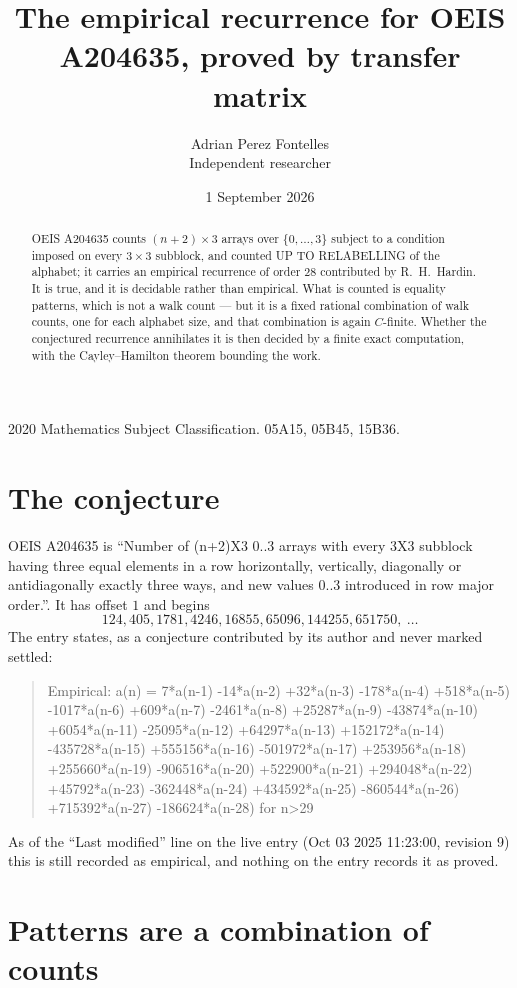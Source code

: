 \documentclass[11pt,a4paper]{article}
\title{The empirical recurrence for OEIS A204635, proved by transfer matrix}
\author{Adrian Perez Fontelles\\ \small Independent researcher}
\date{1 September 2026}
\theoremstyle{plain}
\theoremstyle{definition}
\begin{document}
\maketitle

\begin{abstract}
OEIS A204635 counts $(n+2)\times3$ arrays over $\{0,\dots,3\}$ subject to a condition imposed on
every $3\times3$ subblock, and counted UP TO RELABELLING of the
alphabet; it carries an empirical recurrence of order $28$ contributed by
R.~H.~Hardin. It is true, and it is decidable rather than empirical. What is counted is
equality patterns, which is not a walk count --- but it is a fixed rational combination of
walk counts, one for each alphabet size, and that combination is again $C$-finite. Whether the
conjectured recurrence annihilates it is then decided by a finite exact computation, with the
Cayley--Hamilton theorem bounding the work.
\end{abstract}

\noindent\small 2020 Mathematics Subject Classification. 05A15, 05B45, 15B36.\normalsize

\section{The conjecture}

OEIS A204635 is ``Number of (n+2)X3 0..3 arrays with every 3X3 subblock having three equal elements in a row horizontally, vertically, diagonally or antidiagonally exactly three ways, and new values 0..3 introduced in row major order.''. It has offset $1$ and begins
\[
124, 405, 1781, 4246, 16855, 65096, 144255, 651750,\ \dots
\]
The entry states, as a conjecture contributed by its author and never marked settled:
\begin{quote}
Empirical: a(n) = 7*a(n-1) -14*a(n-2) +32*a(n-3) -178*a(n-4) +518*a(n-5) -1017*a(n-6) +609*a(n-7) -2461*a(n-8) +25287*a(n-9) -43874*a(n-10) +6054*a(n-11) -25095*a(n-12) +64297*a(n-13) +152172*a(n-14) -435728*a(n-15) +555156*a(n-16) -501972*a(n-17) +253956*a(n-18) +255660*a(n-19) -906516*a(n-20) +522900*a(n-21) +294048*a(n-22) +45792*a(n-23) -362448*a(n-24) +434592*a(n-25) -860544*a(n-26) +715392*a(n-27) -186624*a(n-28) for n>29
\end{quote}
As of the ``Last modified'' line on the live entry (Oct 03 2025 11:23:00, revision 9) this is still
recorded as empirical, and nothing on the entry records it as proved.

\section{Patterns are a combination of counts}
\end{document}
